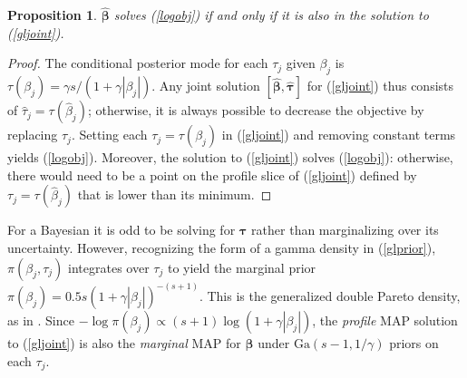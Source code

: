 \documentclass[twoside]{article}
\newtheorem{prop}{\sc Proposition}[section]
\newcommand{\bs}[1]{\boldsymbol{#1}}
\newcommand{\mr}[1]{\mathrm{#1}}
\begin{document}
\begin{prop}\label{penprop}
  $\bs{\hat\beta}$ solves (\ref{logobj}) if and only if it is also in the
  solution to (\ref{gljoint}).
\end{prop}
\begin{proof}
  The conditional posterior mode for each $\tau_j$ given $\beta_j$
  is $\tau(\beta_j) = \gamma s/(1 + \gamma|\beta_j|)$.  Any joint solution
  $[\bs{\hat\beta},\bs{\hat\tau}]$ for (\ref{gljoint}) thus
  consists of $\hat{\tau}_{j} = \tau(\hat\beta_{j})$;
  otherwise, it is always possible to decrease the objective by
  replacing $\hat\tau_{j}$. Setting each $\tau_j = 
  \tau(\beta_j)$ in (\ref{gljoint}) and removing constant terms yields
  (\ref{logobj}).  Moreover, the solution to (\ref{gljoint}) solves
  (\ref{logobj}): otherwise, there would need to be a point on the profile
  slice of (\ref{gljoint}) defined by $\tau_{j} =
  \tau(\hat\beta_{j})$ that is lower than its minimum.
\end{proof}

For a Bayesian it is odd to be solving for $\bs{\tau}$ rather than
marginalizing over its uncertainty.  However, recognizing the form of a gamma
density  in (\ref{glprior}), $\pi(\beta_j,\tau_j)$ integrates over $\tau_j$ to
yield the marginal prior $ \pi(\beta_j) = 0.5s\left( 1+
\gamma|\beta_j|\right)^{-(s+1)}$. This is the generalized double Pareto
density, as in  \citet{armagan_generalized_2013}. Since $-\log \pi(\beta_j)
\propto (s+1)\log(1 + \gamma|\beta_j|)$, the {\it profile} MAP solution to
(\ref{gljoint}) is also the {\it marginal} MAP for
$\bs{\beta}$ under $\mr{Ga}(s-1,1/\gamma)$ priors on each $\tau_j$.




\end{document}

